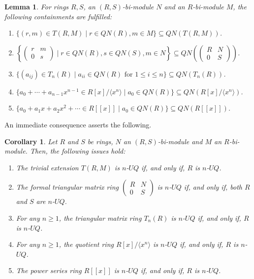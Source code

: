 \documentclass[12pt]{amsart}
\newtheorem{lemma}[theorem]{Lemma}
\newtheorem{corollary}[theorem]{Corollary}
\theoremstyle{definition}
\begin{document}
\begin{lemma}\cite[Lemma 2.8]{daoa}\label{basic property}
For rings $R,S$, an $(R,S)$-bi-module $N$ and an $R$-bi-module $M$, the following containments are fulfilled:
\begin{enumerate}
\item	
$\{(r,m) \in T(R,M) \mid r \in QN(R), m \in M\} \subseteq QN(T(R,M))$.
\item	
$\left\{\begin{pmatrix} r & m \\ 0 & s \end{pmatrix} \mid r \in QN(R), s \in QN(S), m \in N\right\} \subseteq QN\left(\begin{pmatrix} R & N \\ 0 & S \end{pmatrix}\right)$.
\item	
$\{(a_{ij}) \in T_n(R) \mid a_{ii} \in QN(R) \text{ for } 1 \leq i \leq n\} \subseteq QN(T_n(R))$.
\item	
$\{a_0 + \cdots + a_{n-1}x^{n-1} \in R[x]/\langle x^n \rangle \mid a_0 \in QN(R)\} \subseteq QN(R[x]/\langle x^n \rangle)$.
\item	
$\{a_0 + a_1x + a_2x^2 + \cdots \in R[[x]] \mid a_0 \in QN(R)\} \subseteq QN(R[[x]])$.
\end{enumerate}
\end{lemma}

An immediate consequence asserts the following.

\begin{corollary} \label{cor five}
Let $R$ and $S$ be rings, $N$ an $(R,S)$-bi-module and $M$ an $R$-bi-module. Then, the following issues hold:
\begin{enumerate}
\item	
The trivial extension $T(R,M)$ is $n$-$UQ$ if, and only if, $R$ is $n$-$UQ$.
\item	
The formal triangular matrix ring $\begin{pmatrix} R & N \\ 0 & S \end{pmatrix}$ is $n$-$UQ$ if, and only if, both $R$ and $S$ are $n$-$UQ$.
\item	
For any $n \geq 1$, the triangular matrix ring $T_n(R)$ is $n$-$UQ$ if, and only if, $R$ is $n$-$UQ$.
\item	
For any $n \geq 1$, the quotient ring $R[x]/\langle x^n \rangle$ is $n$-$UQ$ if, and only if, $R$ is $n$-$UQ$.
\item	
The power series ring $R[[x]]$ is $n$-$UQ$ if, and only if, $R$ is $n$-$UQ$.
\end{enumerate}
\end{corollary}
\end{document}
